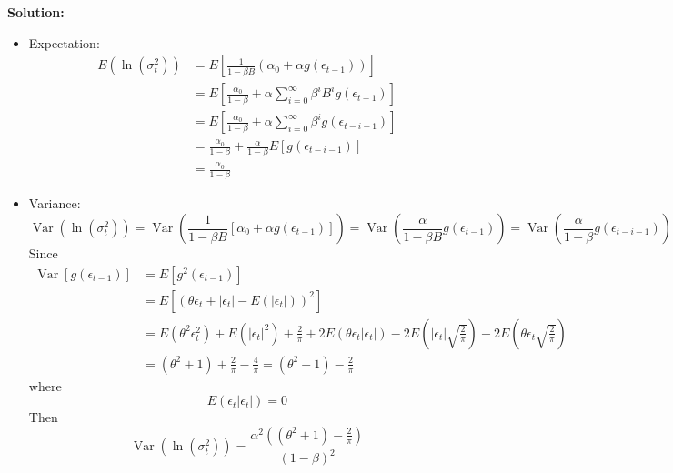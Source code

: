 \documentclass{article}
\begin{document}
\begin{enumerate}
	\textbf{Solution:}
	\begin{itemize}
		\item Expectation:
		\begin{equation*}
		\begin{array}{lllll}
		E(\ln(\sigma_t^2)) &= E\left[\frac{1}{1-\beta B}(\alpha_0 + \alpha g(\epsilon_{t-1}))\right]\\ &= E\left[\frac{\alpha_0}{1-\beta} + \alpha \sum_{i=0}^{\infty} \beta^i B^i g(\epsilon_{t-1})\right]\\ &= E\left[\frac{\alpha_0}{1-\beta} + \alpha \sum_{i=0}^{\infty} \beta^i g(\epsilon_{t-i-1})\right]\\ &= 
		\frac{\alpha_0}{1-\beta} + \frac{\alpha}{1-\beta} E\left[g(\epsilon_{t-i-1})\right]\\ &=
		\frac{\alpha_0}{1-\beta}
		\end{array}
		\end{equation*}
		\item Variance:
		\begin{equation*}
		\operatorname{Var}(\ln(\sigma_t^2)) = \operatorname{Var}\left(\frac{1}{1-\beta B}[\alpha_0 + \alpha g(\epsilon_{t-1})]\right) = \operatorname{Var}\left(\frac{\alpha}{1-\beta B}g(\epsilon_{t-1})\right) = \operatorname{Var}\left(\frac{\alpha}{1-\beta}g(\epsilon_{t-i-1})\right)
		\end{equation*}
		Since
		\begin{equation*}
		\begin{array}{lllll}
		\operatorname{Var}[g(\epsilon_{t-1})] &= E[g^2(\epsilon_{t-1})]\\ &= E\left[\left(\theta \epsilon_{t}+\left|\epsilon_{t}\right|-E\left(\left|\epsilon_{t}\right|\right)\right)^2\right]\\ &= E(\theta^2\epsilon_t^2) + E(|\epsilon_t|^2) + \frac{2}{\pi} + 2E\left(\theta\epsilon_t|\epsilon_t|\right) - 2E\left(|\epsilon_t|\sqrt{\frac{2}{\pi}}\right) - 2E\left(\theta\epsilon_t\sqrt{\frac{2}{\pi}}\right)\\ &= (\theta^2 + 1) + \frac{2}{\pi} - \frac{4}{\pi} = (\theta^2 + 1) - \frac{2}{\pi}
		\end{array}
		\end{equation*}
		where
		\begin{equation*}
		E\left(\epsilon_t|\epsilon_t|\right) = 0
		\end{equation*}
		Then
		\begin{equation*}
		\operatorname{Var}(\ln(\sigma_t^2)) = \frac{\alpha^2 ((\theta^2 + 1) - \frac{2}{\pi})}{(1-\beta)^2} 
		\end{equation*}
	\end{itemize}
	

\end{enumerate}
\end{document}
